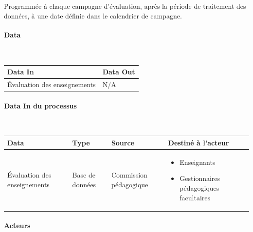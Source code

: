 \documentclass[a4paper,11pt]{report}
\begin{document}
Programmée à chaque campagne d'évaluation, après la période de traitement des données, à une date définie dans le calendrier de campagne.

\paragraph{Data}~\newline{}

\begin{tabularx}{\linewidth}{|X|X|} \hline
Data In & Data Out \\ \hline
Évaluation des enseignements & N/A \\ \hline
\end{tabularx}

\paragraph{Data In du processus}~\newline{}

\begin{tabularx}{\linewidth}{|X|X|X|X|} \hline
Data & Type & Source & Destiné à l'acteur \\ \hline
Évaluation des enseignements & Base de données & Commission pédagogique &
\begin{itemize}
	\item Enseignants
	\item Gestionnaires pédagogiques facultaires\newline{}
\end{itemize}
\\ \hline
\end{tabularx}



\paragraph{Acteurs}~\newline{}
\end{document}
